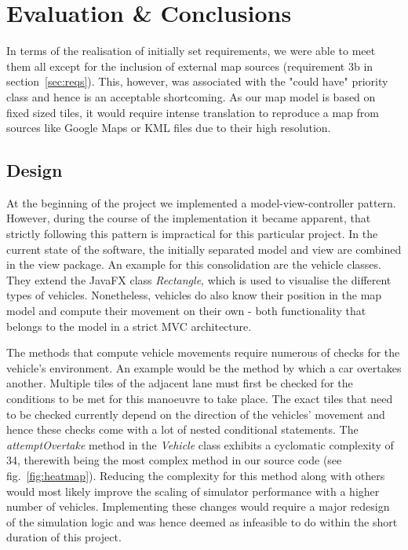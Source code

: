 \section{Evaluation \& Conclusions}
\label{ss:eval_sim}
In terms of the realisation of initially set requirements, we were able to meet them all except for the inclusion of external map sources (requirement 3b in section~\ref{sec:reqs}). This, however, was associated with the "could have" priority class and hence is an acceptable shortcoming. As our map model is based on fixed sized tiles, it would require intense translation to reproduce a map from sources like Google Maps or KML files due to their high resolution. 

\subsection*{Design}
At the beginning of the project we implemented a model-view-controller pattern. However, during the course of the implementation it became apparent, that strictly following this pattern is impractical for this particular project. In the current state of the software, the initially separated model and view are combined in the view package. An example for this consolidation are the vehicle classes. They extend the JavaFX class \textit{Rectangle}, which is used to visualise the different types of vehicles. Nonetheless, vehicles do also know their position in the map model and compute their movement on their own - both functionality that belongs to the model in a strict MVC architecture.

The methods that compute vehicle movements require numerous of checks for the vehicle's environment. An example would be the method by which a car overtakes another. Multiple tiles of the adjacent lane must first be checked for the conditions to be met for this manoeuvre to take place. The exact tiles that need to be checked currently depend on the direction of the vehicles' movement and hence these checks come with a lot of nested conditional statements. The \textit{attemptOvertake} method in the \textit{Vehicle} class exhibits a cyclomatic complexity of 34, therewith being the most complex method in our source code (see fig.~\ref{fig:heatmap}). Reducing the complexity for this method along with others would most likely improve the scaling of simulator performance with a higher number of vehicles. Implementing these changes would require a major redesign of the simulation logic and was hence deemed as infeasible to do within the short duration of this project.

